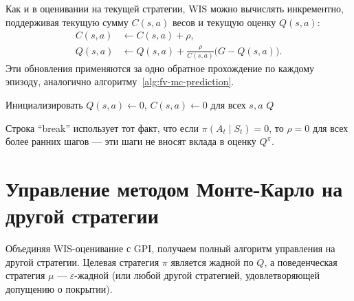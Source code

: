 Как и в оценивании на текущей стратегии, WIS можно вычислять инкрементно, поддерживая текущую сумму $C(s,a)$ весов и текущую оценку $Q(s,a)$:
\begin{align}
  \label{eq:wis-incremental}
  C(s,a) &\leftarrow C(s,a) + \rho, \\
  Q(s,a) &\leftarrow Q(s,a) + \frac{\rho}{C(s,a)}\bigl(G - Q(s,a)\bigr).
\end{align}
Эти обновления применяются за одно обратное прохождение по каждому эпизоду, аналогично алгоритму~\ref{alg:fv-mc-prediction}.

\begin{algorithm}[ht]
\caption{МК на другой стратегии с WIS для оценивания $Q^\pi$}
\label{alg:off-policy-mc-wis}
Инициализировать $Q(s,a) \leftarrow 0$, $C(s,a) \leftarrow 0$ для всех $s,a$\;
\Return $Q$\;
\end{algorithm}

Строка ``break'' использует тот факт, что если $\pi(A_t \mid S_t) = 0$, то $\rho = 0$ для всех более ранних шагов --- эти шаги не вносят вклада в оценку $Q^\pi$.

\section{Управление методом Монте-Карло на другой стратегии}
\label{sec:mc-off-policy-control}

Объединяя WIS-оценивание с GPI, получаем полный алгоритм управления на другой стратегии.  Целевая стратегия $\pi$ является жадной по $Q$, а поведенческая стратегия $\mu$ --- $\varepsilon$-жадной (или любой другой стратегией, удовлетворяющей допущению о покрытии).

